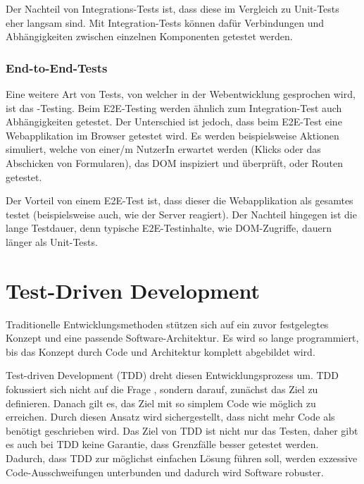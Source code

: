 Der Nachteil von Integrations-Tests ist, dass diese im Vergleich zu Unit-Tests eher langsam sind. Mit Integration-Tests können dafür Verbindungen und Abhängigkeiten zwischen einzelnen Komponenten getestet werden. 

\subsubsection{End-to-End-Tests}
Eine weitere Art von Tests, von welcher in der Webentwicklung gesprochen wird, ist das -Testing. Beim E2E-Testing werden ähnlich zum Integration-Test auch Abhängigkeiten getestet. Der Unterschied ist jedoch, dass beim E2E-Test eine Webapplikation im Browser getestet wird. Es werden beispielsweise Aktionen simuliert, welche von einer/m NutzerIn erwartet werden (Klicks oder das Abschicken von Formularen), das DOM inspiziert und überprüft, oder Routen getestet.

Der Vorteil von einem E2E-Test ist, dass dieser die Webapplikation als gesamtes testet (beispielsweise auch, wie der Server reagiert).
Der Nachteil hingegen ist die lange Testdauer, denn typische E2E-Testinhalte, wie DOM-Zugriffe, dauern länger als Unit-Tests.

\newpage

\section{Test-Driven Development}
\label{section:Test-Driven Development}
\begin{center}
 \autocite[22]{Johansen:2011}
\end{center}
Traditionelle Entwicklungsmethoden stützen sich auf ein zuvor festgelegtes Konzept und eine passende Software-Architektur. Es wird so lange programmiert, bis das Konzept durch Code und Architektur komplett abgebildet wird.

Test-driven Development (TDD) dreht diesen Entwicklungsprozess um. TDD fokussiert sich nicht auf die Frage , sondern darauf, zunächst das Ziel zu definieren. Danach gilt es, das Ziel mit so simplem Code wie möglich zu erreichen. Durch diesen Ansatz wird sichergestellt, dass nicht mehr Code als benötigt geschrieben wird. Das Ziel von TDD ist nicht nur das Testen, daher gibt es auch bei TDD keine Garantie, dass Grenzfälle besser getestet werden. Dadurch, dass TDD zur möglichst einfachen Lösung führen soll, werden exzessive Code-Ausschweifungen unterbunden und dadurch wird Software robuster.

